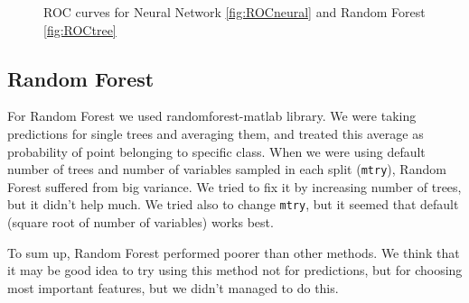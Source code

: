 \documentclass[]{report}
\begin{document}
  \begin{figure}[h]
    \center
    \caption{ROC curves for Neural Network \ref{fig:ROCneural} and Random Forest \ref{fig:ROCtree}}
  \end{figure}

\subsection{Random Forest}

For Random Forest we used randomforest-matlab library\cite{rf}.
We were taking predictions for single trees and averaging them, and treated this average as probability of point belonging to specific class.
When we were using default number of trees and number of variables sampled in each split (\verb+mtry+), Random Forest suffered from big variance. We tried to fix it by increasing number of trees, but it didn't help much.
We tried also to change \verb+mtry+, but it seemed that default (square root of number of variables) works best. 

To sum up, Random Forest performed poorer than other methods.
We think that it may be good idea to try using this method not for predictions, but for choosing most important features, but we didn't managed to do this.
\end{document}
